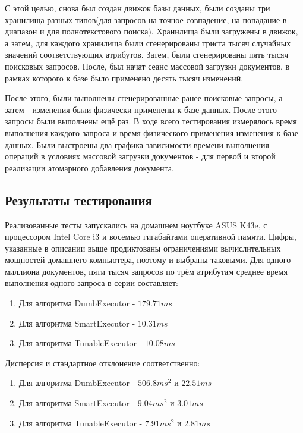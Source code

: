 \documentclass{matmex-diploma}
\begin{document}
        С этой целью, снова был создан движок базы данных, были созданы три хранилища разных типов(для запросов на точное совпадение, на попадание в диапазон и для полнотекстового поиска). Хранилища были загружены в движок, а затем, для каждого хранилища были сгенерированы триста тысяч случайных значений соответствующих атрибутов. Затем, были сгенерированы пять тысяч поисковых запросов. После, был начат сеанс массовой загрузки документов, в рамках которого к базе было применено десять тысяч изменений.
        
        После этого, были выполнены сгенерированные ранее поисковые запросы, а затем - изменения были физически применены к базе данных. После этого запросы были выполнены ещё раз. В ходе всего тестирования измерялось время выполнения каждого запроса и время физического применения изменения к базе данных. Были выстроены два графика зависимости времени выполнения операций в условиях массовой загрузки документов - для первой и второй реализации атомарного добавления документа.
    \subsection{Результаты тестирования}
        Реализованные тесты запускались на домашнем ноутбуке ASUS K43e, с процессором Intel Core i3 и восемью гигабайтами оперативной памяти. Цифры, указанные в описании выше продиктованы ограничениями вычислительных мощностей домашнего компьютера, поэтому и выбраны таковыми.
        Для одного миллиона документов, пяти тысяч запросов по трём атрибутам среднее время выполнения одного запроса в серии составляет:
        \begin{enumerate}
            \item Для алгоритма DumbExecutor - $179.71 ms$
            \item Для алгоритма SmartExecutor - $10.31  ms$
            \item Для алгоритма TunableExecutor - $10.08 ms$ 
        \end{enumerate}
        
        Дисперсия и стандартное отклонение соответственно:
        \begin{enumerate}
            \item Для алгоритма DumbExecutor - $506.8 ms^2$ и $22.51 ms$
            \item Для алгоритма SmartExecutor - $9.04 ms^2$ и $3.01 ms$ 
            \item Для алгоритма TunableExecutor - $7.91 ms^2$ и $2.81 ms$ 
        \end{enumerate}
        
\end{document}
